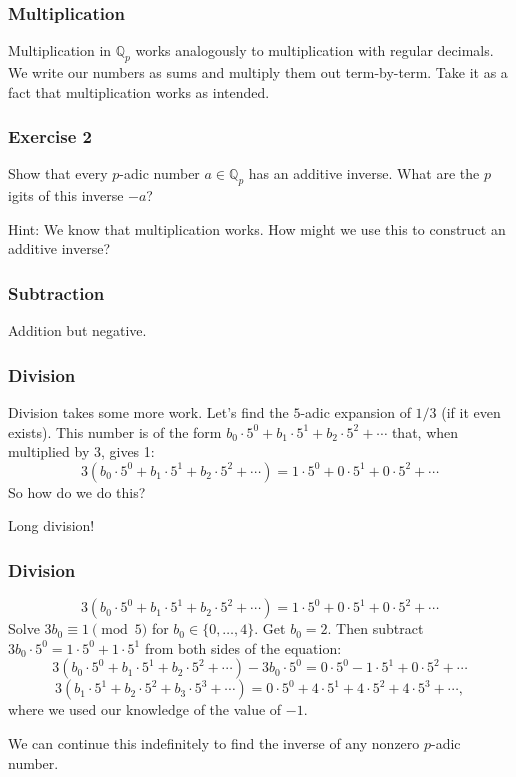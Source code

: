 \documentclass[10pt]{beamer}
\begin{document}
\begin{frame}
    \frametitle{Multiplication}

    Multiplication in \(\mathbb{Q}_p\) works analogously to multiplication with regular decimals.
    We write our numbers as sums and multiply them out term-by-term.
    Take it as a fact that multiplication works as intended.

\end{frame}

\begin{frame}
    \frametitle{Exercise 2}

    Show that every \(p\)-adic number \(a\in\mathbb{Q}_p\) has an additive inverse.
    What are the \(p\)igits of this inverse \(-a\)?

    Hint: We know that multiplication works.
    How might we use this to construct an additive inverse?

\end{frame}

\begin{frame}
    \frametitle{Subtraction}

    Addition but negative.

\end{frame}

\begin{frame}
    \frametitle{Division}

    Division takes some more work.
    Let's find the \(5\)-adic expansion of \(1/3\) (if it even exists).
    This number is of the form \(b_0\cdot 5^0+b_1\cdot 5^1+b_2\cdot 5^2+\cdots\) that, when multiplied by 3, gives 1:
    \[3(b_0\cdot 5^0+b_1\cdot 5^1+b_2\cdot 5^2+\cdots) = 1\cdot 5^0 + 0\cdot 5^1 + 0\cdot 5^2 + \cdots\]
    So how do we do this?

    Long division!

\end{frame}

\begin{frame}
    \frametitle{Division}

    \[3(b_0\cdot 5^0+b_1\cdot 5^1+b_2\cdot 5^2+\cdots) = 1\cdot 5^0 + 0\cdot 5^1 + 0\cdot 5^2 + \cdots\]
    Solve \(3b_0\equiv 1\pmod{5}\) for \(b_0\in\{0,\ldots,4\}\). 
    Get \(b_0=2\).
    Then subtract \(3b_0\cdot 5^0=1\cdot 5^0 + 1\cdot 5^1\) from both sides of the equation:
    \[3(b_0\cdot 5^0+b_1\cdot 5^1+b_2\cdot 5^2+\cdots)-3b_0\cdot 5^0 = 0\cdot 5^0 - 1\cdot 5^1 + 0\cdot 5^2 + \cdots\]
    \[3(b_1\cdot 5^1+b_2\cdot 5^2+b_3\cdot 5^3+\cdots)=0\cdot 5^0+4\cdot 5^1+4\cdot 5^2+4\cdot 5^3+\cdots,\]
    where we used our knowledge of the value of \(-1\).

    We can continue this indefinitely to find the inverse of any nonzero \(p\)-adic number.

\end{frame}
\end{document}
